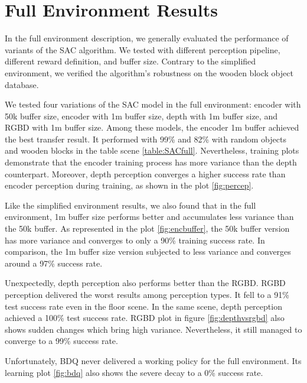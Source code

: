 \section{Full Environment Results}


In the full environment description, we generally evaluated the performance of variants of the SAC algorithm. We tested with different perception pipeline, different reward definition, and buffer size. Contrary to the simplified environment, we verified the algorithm's robustness on the wooden block object database.

We tested four variations of the SAC model in the full environment: encoder with 50k buffer size, encoder with 1m buffer size, depth with 1m buffer size, and RGBD with 1m buffer size. Among these models, the encoder 1m buffer achieved the best transfer result. It performed with 99\% and 82\% with random objects and wooden blocks in the table scene \ref{table:SACfull}. Nevertheless, training plots demonstrate that the encoder training process has more variance than the depth counterpart. Moreover, depth perception converges a higher success rate than encoder perception during training, as shown in the plot \ref{fig:percep}.

Like the simplified environment results, we also found that in the full environment, 1m buffer size performs better and accumulates less variance than the 50k buffer. As represented in the plot \ref{fig:encbuffer}, the 50k buffer version has more variance and converges to only a 90\% training success rate. In comparison, the 1m buffer size version subjected to less variance and converges around a 97\% success rate.  

Unexpectedly, depth perception also performs better than the RGBD. RGBD perception delivered the worst results among perception types. It fell to a 91\% test success rate even in the floor scene. In the same scene, depth perception achieved a 100\% test success rate. RGBD plot in figure \ref{fig:depthvsrgbd} also shows sudden changes which bring high variance. Nevertheless, it still managed to converge to a 99\% success rate.

Unfortunately, BDQ never delivered a working policy for the full environment. Its learning plot \ref{fig:bdq} also shows the severe decay to a 0\% success rate.


